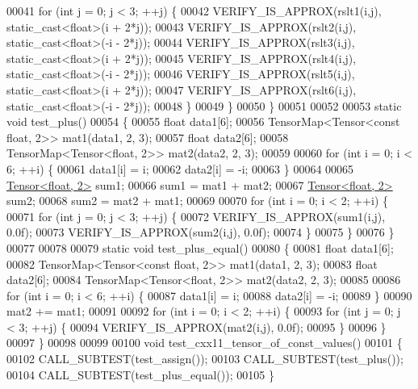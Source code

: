 \begin{DoxyCode}
00041     \textcolor{keywordflow}{for} (\textcolor{keywordtype}{int} j = 0; j < 3; ++j) \{
00042       VERIFY\_IS\_APPROX(rslt1(i,j), static\_cast<float>(i + 2*j));
00043       VERIFY\_IS\_APPROX(rslt2(i,j), static\_cast<float>(-i - 2*j));
00044       VERIFY\_IS\_APPROX(rslt3(i,j), static\_cast<float>(i + 2*j));
00045       VERIFY\_IS\_APPROX(rslt4(i,j), static\_cast<float>(-i - 2*j));
00046       VERIFY\_IS\_APPROX(rslt5(i,j), static\_cast<float>(i + 2*j));
00047       VERIFY\_IS\_APPROX(rslt6(i,j), static\_cast<float>(-i - 2*j));
00048     \}
00049   \}
00050 \}
00051 
00052 
00053 \textcolor{keyword}{static} \textcolor{keywordtype}{void} test\_plus()
00054 \{
00055   \textcolor{keywordtype}{float} data1[6];
00056   TensorMap<Tensor<const float, 2>> mat1(data1, 2, 3);
00057   \textcolor{keywordtype}{float} data2[6];
00058   TensorMap<Tensor<float, 2>> mat2(data2, 2, 3);
00059 
00060   \textcolor{keywordflow}{for} (\textcolor{keywordtype}{int} i = 0; i < 6; ++i) \{
00061     data1[i] = i;
00062     data2[i] = -i;
00063   \}
00064 
00065   \hyperlink{class_eigen_1_1_tensor}{Tensor<float, 2>} sum1;
00066   sum1 = mat1 + mat2;
00067   \hyperlink{class_eigen_1_1_tensor}{Tensor<float, 2>} sum2;
00068   sum2 = mat2 + mat1;
00069 
00070   \textcolor{keywordflow}{for} (\textcolor{keywordtype}{int} i = 0; i < 2; ++i) \{
00071     \textcolor{keywordflow}{for} (\textcolor{keywordtype}{int} j = 0; j < 3; ++j) \{
00072       VERIFY\_IS\_APPROX(sum1(i,j), 0.0f);
00073       VERIFY\_IS\_APPROX(sum2(i,j), 0.0f);
00074     \}
00075   \}
00076 \}
00077 
00078 
00079 \textcolor{keyword}{static} \textcolor{keywordtype}{void} test\_plus\_equal()
00080 \{
00081   \textcolor{keywordtype}{float} data1[6];
00082   TensorMap<Tensor<const float, 2>> mat1(data1, 2, 3);
00083   \textcolor{keywordtype}{float} data2[6];
00084   TensorMap<Tensor<float, 2>> mat2(data2, 2, 3);
00085 
00086   \textcolor{keywordflow}{for} (\textcolor{keywordtype}{int} i = 0; i < 6; ++i) \{
00087     data1[i] = i;
00088     data2[i] = -i;
00089   \}
00090   mat2 += mat1;
00091 
00092   \textcolor{keywordflow}{for} (\textcolor{keywordtype}{int} i = 0; i < 2; ++i) \{
00093     \textcolor{keywordflow}{for} (\textcolor{keywordtype}{int} j = 0; j < 3; ++j) \{
00094       VERIFY\_IS\_APPROX(mat2(i,j), 0.0f);
00095     \}
00096   \}
00097 \}
00098 
00099 
00100 \textcolor{keywordtype}{void} test\_cxx11\_tensor\_of\_const\_values()
00101 \{
00102   CALL\_SUBTEST(test\_assign());
00103   CALL\_SUBTEST(test\_plus());
00104   CALL\_SUBTEST(test\_plus\_equal());
00105 \}
\end{DoxyCode}
